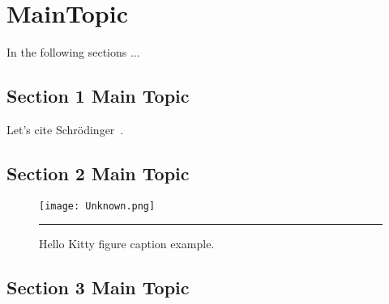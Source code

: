 \chapter{MainTopic}
\label{chap:mainTopic}

In the following sections ...


\section[Section 1]{Section 1 Main Topic}
\label{section:1}
Let's cite Schr\"{o}dinger~\cite{schrodingere26}.  

\section[Section 2]{Section 2 Main Topic}
\label{section:2}

\begin{figure}[htbp]
 \centering
  \centerline{\texttt{[image: Unknown.png]}}
  \rule{35em}{0.5pt}
  \caption[Hello Kitty]{Hello Kitty figure caption example.}
 \label{fig:helloKitty}
\end{figure}

\section[Section 3]{Section 3 Main Topic}
\label{section:1}
